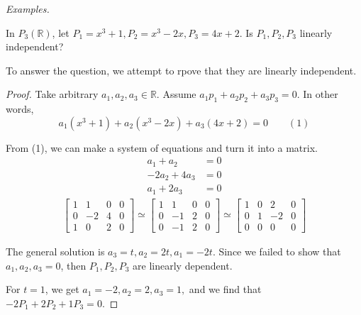 \documentclass[11pt]{article}
\begin{document}
    \vspace{1em}

    \emph{Examples.}

    \vspace{1em}

    In \(P_3(\mathbb{R})\), let \(P_1 = x^3 + 1, P_2 = x^3 - 2x, P_3 = 4x + 2.\) Is \(P_1, P_2, P_3\) linearly independent?

    To answer the question, we attempt to rpove that they are linearly independent.

    \begin{proof}
        Take arbitrary \(a_1, a_2, a_3 \in \mathbb{R}\). Assume \(a_1 p_1 + a_2 p_2 + a_3 p_3 = 0.\) In other words, \[a_1 (x^3 + 1) + a_2 (x^3 - 2x) + a_3 (4x + 2) = 0 \qquad (1)\] 

        From (1), we can make a system of equations and turn it into a matrix.
        \begin{align*}
            a_1 + a_2    &= 0 \\
            -2a_2 + 4a_3 &= 0 \\
            a_1 + 2 a_3  &= 0
        \end{align*}
        \begin{align*}
            \begin{bmatrix}
                1 & 1  & 0 & 0 \\
                0 & -2 & 4 & 0 \\
                1 & 0  & 2 & 0
            \end{bmatrix} \simeq \begin{bmatrix}
                                    1 & 1  & 0 & 0 \\
                                    0 & -1 & 2 & 0 \\
                                    0 & -1 & 2 & 0 
                                \end{bmatrix} \simeq \begin{bmatrix}
                                    1 & 0 & 2  & 0 \\
                                    0 & 1 & -2 & 0 \\
                                    0 & 0 & 0  & 0
                                \end{bmatrix}
        \end{align*}

        The general solution is \(a_3 = t, a_2 = 2t, a_1 = -2t\). Since we failed to show that \(a_1, a_2, a_3 = 0\), then \(P_1, P_2, P_3\) are linearly dependent. 

        For \(t = 1\), we get \(a_1 = -2, a_2 = 2, a_3 = 1, \) and we find that \(-2P_1 + 2P_2 + 1 P_3 = 0.\)
    \end{proof}
\end{document}

